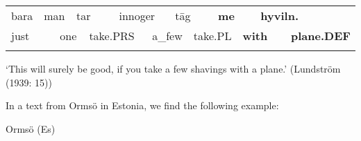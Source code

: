 \begin{tabular}{llllllllllllll}
\lsptoprule
bara & \multicolumn{2}{l}{man

} & \multicolumn{2}{l}{tar

} & \multicolumn{2}{l}{innoger

} & \multicolumn{2}{l}{t\=ag

} & \multicolumn{2}{l}{{\bfseries me}

} & \multicolumn{2}{l}{{\bfseries hyviln.}

} & \\
\multicolumn{2}{l}{just

} & \multicolumn{2}{l}{one

} & \multicolumn{2}{l}{take.PRS

} & \multicolumn{2}{l}{a\_few

} & \multicolumn{2}{l}{take.PL

} & \multicolumn{2}{l}{{\bfseries with}

} & \multicolumn{2}{l}{{\bfseries plane.DEF}

}\\
\lspbottomrule
\end{tabular}

\begin{styleTranslation}
‘This will surely be good, if you take a few shavings with a plane.’ (Lundström (1939: 15))

\end{styleTranslation}

\begin{styleBodyTextFirst}
In a text from Ormsö in Estonia, we find the following example:

\end{styleBodyTextFirst}


\begin{listWWNumileveli}
\item 

\begin{styleExample}
Ormsö (Es)

\end{styleExample}

\end{listWWNumileveli}

